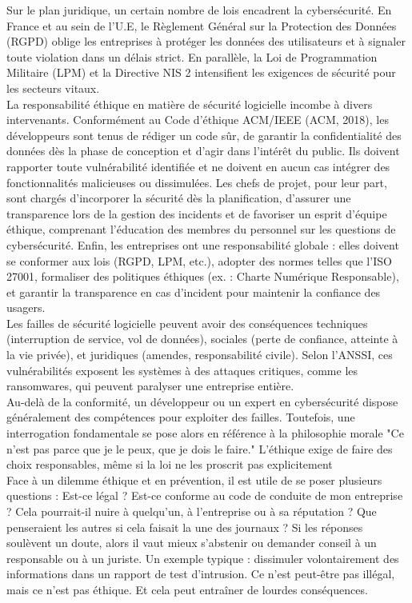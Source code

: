 \documentclass{article}
\begin{document}
Sur le plan juridique, un certain nombre de lois encadrent la cybersécurité. En France et au sein
de l’U.E, le Règlement Général sur la Protection des Données (RGPD) oblige les entreprises à
protéger les données des utilisateurs et à signaler toute violation dans un délais strict. En
parallèle, la Loi de Programmation Militaire (LPM) et la Directive NIS 2 intensifient les exigences
de sécurité pour les secteurs vitaux.\\

La responsabilité éthique en matière de sécurité logicielle incombe à divers intervenants.
Conformément au Code d'éthique ACM/IEEE (ACM, 2018), les développeurs sont tenus de
rédiger un code sûr, de garantir la confidentialité des données dès la phase de conception et
d'agir dans l'intérêt du public. Ils doivent rapporter toute vulnérabilité identifiée et ne doivent
en aucun cas intégrer des fonctionnalités malicieuses ou dissimulées. Les chefs de projet, pour
leur part, sont chargés d’incorporer la sécurité dès la planification, d’assurer une transparence
lors de la gestion des incidents et de favoriser un esprit d'équipe éthique, comprenant
l'éducation des membres du personnel sur les questions de cybersécurité. Enfin, les entreprises
ont une responsabilité globale : elles doivent se conformer aux lois (RGPD, LPM, etc.), adopter
des normes telles que l’ISO 27001, formaliser des politiques éthiques (ex. : Charte Numérique
Responsable), et garantir la transparence en cas d’incident pour maintenir la confiance des
usagers.\\

Les failles de sécurité logicielle peuvent avoir des conséquences techniques (interruption
de service, vol de données), sociales (perte de confiance, atteinte à la vie privée), et juridiques
(amendes, responsabilité civile). Selon l’ANSSI, ces vulnérabilités exposent les systèmes à des
attaques critiques, comme les ransomwares, qui peuvent paralyser une entreprise entière.\\

Au-delà de la conformité, un développeur ou un expert en cybersécurité dispose
généralement des compétences pour exploiter des failles. Toutefois, une interrogation
fondamentale se pose alors en référence à la philosophie morale
"Ce n’est pas parce que je le
peux, que je dois le faire." L’éthique exige de faire des choix responsables, même si la loi ne les
proscrit pas explicitement\\

Face à un dilemme éthique et en prévention, il est utile de se poser plusieurs questions : Est-ce
légal ? Est-ce conforme au code de conduite de mon entreprise ? Cela pourrait-il nuire à
quelqu’un, à l’entreprise ou à sa réputation ? Que penseraient les autres si cela faisait la une
des journaux ?
Si les réponses soulèvent un doute, alors il vaut mieux s’abstenir ou demander conseil à un
responsable ou à un juriste. Un exemple typique : dissimuler volontairement des informations
dans un rapport de test d’intrusion. Ce n’est peut-être pas illégal, mais ce n’est pas éthique. Et
cela peut entraîner de lourdes conséquences.\\
\end{document}
